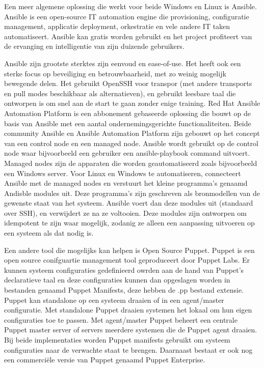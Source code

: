 Een meer algemene oplossing die werkt voor beide Windows en Linux is Ansible.
Ansible is een open-source IT automation engine die provisioning, configuratie management, applicatie deployment, orkestratie en vele andere IT taken automatiseert.
Ansible kan gratis worden gebruikt en het project profiteert van de ervanging en intelligentie van zijn duizende gebruikers. \autocite{Ansible}

Ansible zijn grootste sterktes zijn eenvoud en ease-of-use. Het heeft ook een sterke focus op beveiliging en betrouwbaarheid, met zo weinig mogelijk bewegende delen. Het gebruikt OpenSSH voor transpor (met andere transports en pull modes beschikbaar als alternatieven), en gebruikt leesbare taal die ontworpen is om snel aan de start te gaan zonder enige training.
Red Hat Ansible Automation Platform is een abbonement gebaseerde oplossing die bouwt op de basis van Ansible met een aantal ondernemingsgerichte functionaliteiten.
Beide community Ansible en Ansible Automation Platform zijn gebouwt op het concept van een control node en een managed node. Ansible wordt gebruikt op de control node waar bijvoorbeeld een gebruiker een ansible-playbook command uitvoert. Managed nodes zijn de apparaten die worden geautomatiseerd zoals bijvoorbeeld een Windows server.
Voor Linux en Windows te automatiseren, connecteert Ansible met de managed nodes en verstuurt het kleine programma's genaamd Andisble modules uit. Deze programma's zijn geschreven als bronmodellen van de gewenste staat van het systeem. Ansible voert dan deze modules uit (standaard over SSH), en verwijdert ze na ze voltooien.
Deze modules zijn ontworpen om idempotent te zijn waar mogelijk, zodanig ze alleen een aanpassing uitvoeren op een systeem als dat nodig is. \autocite{AnisbleHow} \break

Een andere tool die mogelijks kan helpen is Open Source Puppet.
Puppet is een open source conifguartie management tool geproduceert door Puppet Labs. Er kunnen systeem configuraties gedefinieerd owrden aan de hand van Puppet's declaratieve taal en deze configuraties kunnen dan opgeslagen worden in bestanden genaamd Puppet Manifests, deze hebben de .pp bestand extensie.
Puppet kan standalone op een systeem draaien of in een agent/master configuratie. Met standalone Puppet draaien systemen het lokaal om hun eigen configuraties toe te passen. Met agent/master Puppet beheert een centrale Puppet master server of servers meerdere systemen die de Puppet agent draaien.
Bij beide implementaties worden Puppet manifests gebruikt om systeem configuraties naar de verwachte staat te brengen. Daarnaast bestaat er ook nog een commerciële versie van Puppet genaamd Puppet Enterprise. \autocite{Puppet} \break

